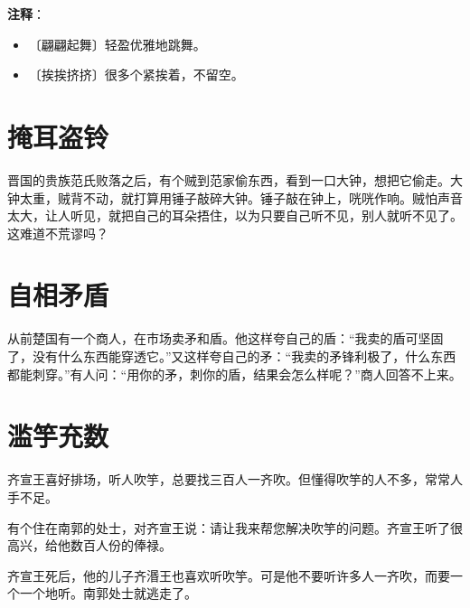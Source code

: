 \documentclass[12pt,UTF-8,openany]{ctexbook}
\begin{document}
\newpage

\textbf{注释}：

\vspace{-1em}

\begin{itemize}
    \setlength\itemsep{-0.2em}
    \item 〔翩翩起舞〕轻盈优雅地跳舞。
    \item 〔挨挨挤挤〕很多个紧挨着，不留空。
\end{itemize}

\chapter{掩耳盗铃}

\begin{Large}
    
    晋国的贵族范氏败落之后，有个贼到范家偷东西，看到一口大钟，想把它偷走。大钟太重，贼背不动，就打算用锤子敲碎大钟。锤子敲在钟上，咣咣作响。贼怕声音太大，让人听见，就把自己的耳朵捂住，以为只要自己听不见，别人就听不见了。这难道不荒谬吗？
    
\end{Large}

\chapter{自相矛盾}

\begin{Large}
    
    从前楚国有一个商人，在市场卖矛和盾。他这样夸自己的盾：“我卖的盾可坚固了，没有什么东西能穿透它。”又这样夸自己的矛：“我卖的矛锋利极了，什么东西都能刺穿。”有人问：“用你的矛，刺你的盾，结果会怎么样呢？”商人回答不上来。
    
\end{Large}

\chapter{滥竽充数}

\begin{Large}
    
    齐宣王喜好排场，听人吹竽，总要找三百人一齐吹。但懂得吹竽的人不多，常常人手不足。
    
    有个住在南郭的处士，对齐宣王说：请让我来帮您解决吹竽的问题。齐宣王听了很高兴，给他数百人份的俸禄。
    
    齐宣王死后，他的儿子齐湣王也喜欢听吹竽。可是他不要听许多人一齐吹，而要一个一个地听。南郭处士就逃走了。
    
\end{Large}
\end{document}
